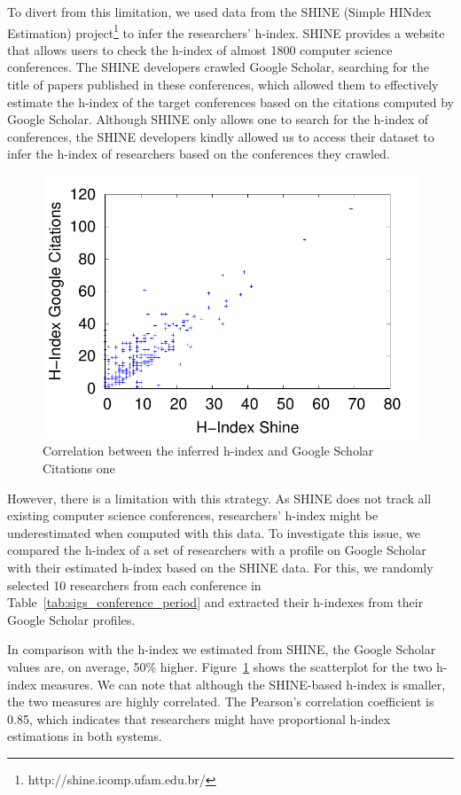 \documentclass{sig-alternate-10pt}
\begin{document}
To divert from this limitation, we used data from the SHINE (Simple HINdex Estimation) project\footnote{http://shine.icomp.ufam.edu.br/} to infer the researchers' h-index. SHINE provides a website that allows users to check the h-index of almost 1800 computer science conferences. The SHINE developers crawled Google Scholar, searching for the title of papers published in these conferences, which allowed them to effectively estimate the h-index of the target conferences based on the citations computed by Google Scholar. Although SHINE only allows one to search for the h-index of conferences, the SHINE developers kindly allowed us to access their dataset to infer the h-index of researchers based on the conferences they crawled.

\begin{figure}[!htb]
\centering
\includegraphics[scale=.45]{graficos/hindex/hindex_scatter_plot-eps-converted-to.pdf}
\caption{Correlation between the inferred h-index and Google Scholar Citations one}
\label{fig:hindex_scatter_plot}
\end{figure}

However, there is a limitation with this strategy. As SHINE does not track all existing computer science conferences, researchers' h-index might be underestimated when computed with this data. To investigate this issue, we compared the h-index of a set of researchers with a profile on Google Scholar with their estimated h-index based on the SHINE data. For this, we randomly selected 10 researchers from each conference in Table~\ref{tab:sigs_conference_period} and extracted their h-indexes from their Google Scholar profiles. 

In comparison with the h-index we estimated from SHINE, the Google Scholar values are, on average, 50\% higher.
Figure~\ref{fig:hindex_scatter_plot} shows the scatterplot for the two h-index measures. We can note that although the SHINE-based h-index is smaller, the two measures are highly correlated. The Pearson's correlation coefficient is 0.85, which indicates that researchers might have proportional h-index estimations in both systems.
\end{document}
